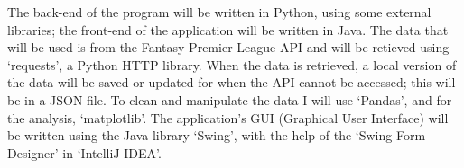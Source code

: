 \documentclass[12pt, a4paper,oneside]{book}
\numberwithin{equation}{section}
\begin{document}
The back-end of the program will be written in Python, using some external libraries; the
front-end of the application will be written in Java. The data that will be used is from the
Fantasy Premier League API and will be retieved using `requests', a Python HTTP library.
When the data is retrieved, a local version of the data will be saved or updated for when
the API cannot be accessed; this will be in a JSON file. To clean and manipulate the data I
will use `Pandas', and for the analysis, `matplotlib'. The application's GUI (Graphical User
Interface) will be written using the Java library `Swing', with the help of the `Swing Form
Designer' in `IntelliJ IDEA'.
\end{document}
